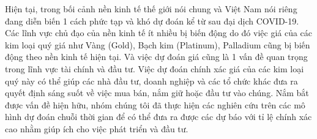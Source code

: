 Hiện tại, trong bối cảnh nền kinh tế thế giới nói chung và Việt Nam nói riêng đang diễn biến 1 cách phức tạp và khó dự đoán kể từ sau đại dịch COVID-19. Các lĩnh vực chủ đạo của nền kinh tế ít nhiều bị biến động do đó việc giá của các kim loại quý giá như Vàng (Gold), Bạch kim (Platinum), Palladium cũng bị biến động theo nền kinh tế hiện tại. Và việc dự đoán giá cũng là 1 vấn đề quan trọng trong lĩnh vực tài chính và đầu tư. Việc dự đoán chính xác giá của các kim loại quý này có thể giúp các nhà đầu tư, doanh nghiệp và các tổ chức khác đưa ra quyết định sáng suốt về việc mua bán, nắm giữ hoặc đầu tư vào chúng. Nắm bắt được vấn đề hiện hữu, nhóm chúng tôi đã thực hiện các nghiên cứu trên các mô hình dự đoán chuỗi thời gian để có thể đưa ra được các dự báo với tỉ lệ chính xác cao nhằm giúp ích cho việc phát triển và đầu tư.